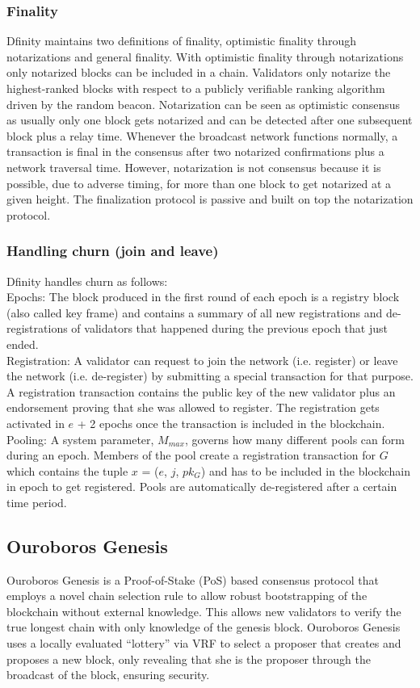 \documentclass[10pt,journal,compsoc]{IEEEtran}
\begin{document}
\subsubsection{Finality}
Dfinity maintains two definitions of finality, optimistic finality through notarizations and general finality. With optimistic finality through notarizations only notarized blocks can be included in a chain. Validators only notarize the highest-ranked blocks with respect to a publicly verifiable ranking algorithm driven by the random beacon. Notarization can be seen as optimistic consensus as usually only one block gets notarized and can be detected after one subsequent block plus a relay time. Whenever the broadcast network functions normally, a transaction is final in the consensus after two notarized confirmations plus a network traversal time. However, notarization is not consensus because it is possible, due to adverse timing, for more than one block to get notarized at a given height. The finalization protocol is passive and built on top the notarization protocol.

\subsubsection{Handling churn (join and leave)}
Dfinity handles churn as follows: 
\\
Epochs: The block produced in the first round of each epoch is a registry block (also called key frame) and contains a summary of all new registrations and de-registrations of validators that happened during the previous epoch that just ended.
\\
Registration: A validator can request to join the network (i.e. register) or leave the network (i.e. de-register) by submitting a special transaction for that purpose. A registration transaction contains the public key of the new validator plus an endorsement proving that she was allowed to register. The registration gets activated in $e$ + 2 epochs once the transaction is included in the blockchain.
\\
Pooling: A system parameter, $M_{max}$, governs how many different pools can form during an epoch. Members of the pool create a registration transaction for $G$ which contains the tuple $x$ = ($e$, $j$, $pk_{G}$) and has to be included in the blockchain in epoch to get registered. Pools are automatically de-registered after a certain time period.

\subsection{Ouroboros Genesis}
Ouroboros Genesis \cite{Genesis} is a Proof-of-Stake (PoS) based consensus protocol that employs a novel chain selection rule to allow robust bootstrapping of the blockchain without external knowledge. This allows new validators to verify the true longest chain with only knowledge of the genesis block. Ouroboros Genesis uses a locally evaluated “lottery” via VRF to select a proposer that creates and proposes a new block, only revealing that she is the proposer through the broadcast of the block, ensuring security.
\end{document}
